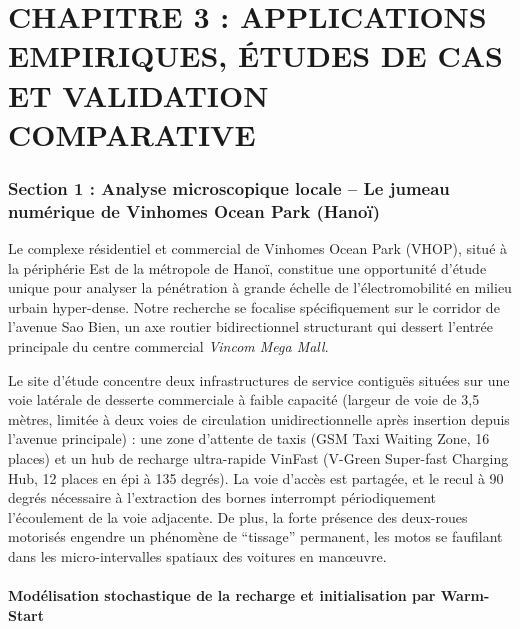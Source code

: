 \documentclass[10pt, a4paper]{article}
\begin{document}
\newpage

\section{CHAPITRE 3 : APPLICATIONS EMPIRIQUES, ÉTUDES DE CAS ET
VALIDATION
COMPARATIVE}\label{chapitre-3-applications-empiriques-uxe9tudes-de-cas-et-validation-comparative}

\subsubsection{Section 1 : Analyse microscopique locale -- Le jumeau
numérique de Vinhomes Ocean Park
(Hanoï)}\label{section-1-analyse-microscopique-locale-le-jumeau-numuxe9rique-de-vinhomes-ocean-park-hanouxef}

Le complexe résidentiel et commercial de Vinhomes Ocean Park (VHOP),
situé à la périphérie Est de la métropole de Hanoï, constitue une
opportunité d'étude unique pour analyser la pénétration à grande échelle
de l'électromobilité en milieu urbain hyper-dense. Notre recherche se
focalise spécifiquement sur le corridor de l'avenue Sao Bien, un axe
routier bidirectionnel structurant qui dessert l'entrée principale du
centre commercial \emph{Vincom Mega Mall}.

Le site d'étude concentre deux infrastructures de service contiguës
situées sur une voie latérale de desserte commerciale à faible capacité
(largeur de voie de 3,5 mètres, limitée à deux voies de circulation
unidirectionnelle après insertion depuis l'avenue principale) : une zone
d'attente de taxis (GSM Taxi Waiting Zone, 16 places) et un hub de
recharge ultra-rapide VinFast (V-Green Super-fast Charging Hub, 12
places en épi à 135 degrés). La voie d'accès est partagée, et le recul à
90 degrés nécessaire à l'extraction des bornes interrompt périodiquement
l'écoulement de la voie adjacente. De plus, la forte présence des
deux-roues motorisés engendre un phénomène de ``tissage'' permanent, les
motos se faufilant dans les micro-intervalles spatiaux des voitures en
manœuvre.

\paragraph{Modélisation stochastique de la recharge et initialisation
par
Warm-Start}\label{moduxe9lisation-stochastique-de-la-recharge-et-initialisation-par-warm-start}
\end{document}
